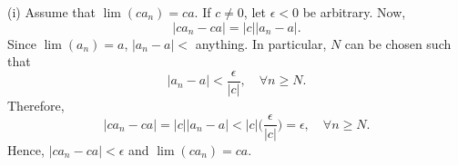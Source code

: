 \documentclass{article}
\begin{document}
                (i) Assume that $\lim(ca_n)=ca$. If $c \neq 0$, let $\epsilon<0$ be arbitrary. Now,
                \begin{equation*}
                    |ca_n - ca| = |c| |a_n - a|.
                \end{equation*}
                Since $\lim(a_n)=a$, $|a_n-a|<$ anything. In particular, $N$ can be chosen such that
                \begin{equation*}
                    |a_n-a| < \frac{\epsilon}{|c|}, \quad \forall n \geq N.
                \end{equation*}
                Therefore,
                \begin{equation*}
                    |ca_n-ca| = |c| |a_n-a| < |c| \bigg(\frac{\epsilon}{|c|}\bigg) = \epsilon, \quad \forall n \geq N.
                \end{equation*}
                Hence, $|ca_n-ca|<\epsilon$ and $\lim (ca_n)=ca$.
                
\end{document}
